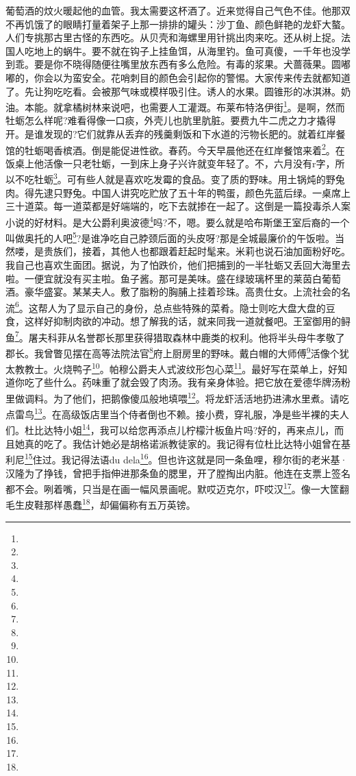 \par 葡萄酒的炆火暖起他的血管。我太需要这杯酒了。近来觉得自己气色不佳。他那双不再饥饿了的眼睛打量着架子上那一排排的罐头：沙丁鱼、颜色鲜艳的龙虾大螯。人们专挑那古里古怪的东西吃。从贝壳和海螺里用针挑出肉来吃。还从树上捉。法国人吃地上的蜗牛。要不就在钩子上挂鱼饵，从海里钓。鱼可真傻，一千年也没学到乖。要是你不晓得随便往嘴里放东西有多么危险。有毒的浆果。犬蔷薇果。圆嘟嘟的，你会以为蛮安全。花哨刺目的颜色会引起你的警惕。大家传来传去就都知道了。先让狗吃吃看。会被那气味或模样吸引住。诱人的水果。圆锥形的冰淇淋。奶油。本能。就拿橘树林来说吧，也需要人工灌溉。布莱布特洛伊街\footnote{}。是啊，然而牡蛎怎么样呢?难看得像一口痰，外壳儿也肮里肮脏。要费九牛二虎之力才撬得开。是谁发现的?它们就靠从丢弃的残羹剩饭和下水道的污物长肥的。就着红岸餐馆的牡蛎喝香槟酒。倒是能促进性欲。春药。今天早晨他还在红岸餐馆来着\footnote{}。在饭桌上他活像一只老牡蛎，一到床上身子兴许就变年轻了。不，六月没有r字，所以不吃牡蛎\footnote{}。可有些人就是喜欢吃发霉的食品。变了质的野味。用土锅炖的野兔肉。得先逮只野兔。中国人讲究吃贮放了五十年的鸭蛋，颜色先蓝后绿。一桌席上三十道菜。每一道菜都是好端端的，吃下去就掺在一起了。这倒是一篇投毒杀人案小说的好材料。是大公爵利奥波德\footnote{}吗?不，嗯。要么就是哈布斯堡王室后裔的一个叫做奥托的人吧\footnote{}?是谁净吃自己脖颈后面的头皮呀?那是全城最廉价的午饭啦。当然喽，是贵族们，接着，其他人也都跟着赶起时髦来。米莉也说石油加面粉好吃。我自己也喜欢生面团。据说，为了怕跌价，他们把捕到的一半牡蛎又丢回大海里去啦。一便宜就没有买主啦。鱼子酱。那可是美味。盛在绿玻璃杯里的莱茵白葡萄酒。豪华盛宴。某某夫人。敷了脂粉的胸脯上挂着珍珠。高贵仕女。上流社会的名流\footnote{}。这帮人为了显示自己的身份，总点些特殊的菜肴。隐士则吃大盘大盘的豆食，这样好抑制肉欲的冲动。想了解我的话，就来同我一道就餐吧。王室御用的鲟鱼\footnote{}。屠夫科菲从名誉郡长那里获得猎取森林中鹿类的权利。他将半头母牛孝敬了郡长。我曾瞥见摆在高等法院法官\footnote{}府上厨房里的野味。戴白帽的大师傅\footnote{}活像个犹太教教士。火烧鸭子\footnote{}。帕穆公爵夫人式波纹形包心菜\footnote{}。最好写在菜单上，好知道你吃了些什么。药味重了就会毁了肉汤。我有亲身体验。把它放在爱德华牌汤粉里做调料。为了他们，把鹅像傻瓜般地填喂\footnote{}。将龙虾活活地扔进沸水里煮。请吃点雷鸟\footnote{}。在高级饭店里当个侍者倒也不赖。接小费，穿礼服，净是些半裸的夫人们。杜比达特小姐\footnote{}，我可以给您再添点儿柠檬汁板鱼片吗?好的，再来点儿，而且她真的吃了。我估计她必是胡格诺派教徒家的。我记得有位杜比达特小姐曾在基利尼\footnote{}住过。我记得法语du dela\footnote{}。但也许这就是同一条鱼哩，穆尔街的老米基·汉隆为了挣钱，曾把手指伸进那条鱼的腮里，开了膛掏出内脏。他连在支票上签名都不会。咧着嘴，只当是在画一幅风景画呢。默哎迈克尔，吓哎汉\footnote{}。像一大筐翻毛生皮鞋那样愚蠢\footnote{}，却偏偏称有五万英镑。

